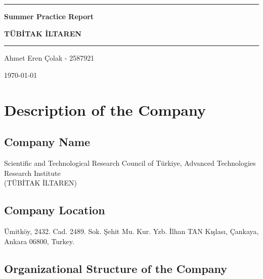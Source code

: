 \documentclass[12pt]{report}
\begin{document}
\begin{titlepage}
    \vspace*{4cm}
    \rule{\textwidth}{2px}

    \begin{center}
        \textbf{\huge{{Summer Practice Report }}}\par \vspace{0.2cm}
        \textbf{\Large{{TÜBİTAK İLTAREN}}}\par
    \end{center}
    
    \rule{\textwidth}{2px}
    
    \vspace{1cm}
    
    \begin{center}
        \large{Ahmet Eren Çolak - 2587921}
    \end{center}

    \vspace{1.3cm}
    
    \vfill
    \today
    
\end{titlepage}

\tableofcontents
\listoffigures
\listoftables

\chapter{Description of the Company}

    \section{Company Name}
    Scientific and Technological Research Council of Türkiye, Advanced Technologies Research Institute \\
    (TÜBİTAK İLTAREN)
    \section{Company Location}
    Ümitköy, 2432. Cad. 2489. Sok. Şehit Mu. Kur. Yzb. İlhan TAN Kışlası,
    Çankaya, Ankara 06800,
    Turkey.
    \section{Organizational Structure of the Company}
\end{document}
